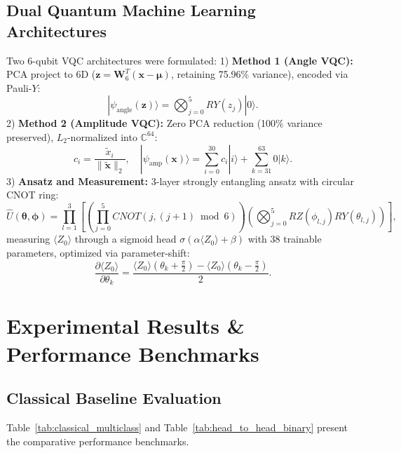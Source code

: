 \documentclass{ieeeaccess}
\begin{document}
\subsection{Dual Quantum Machine Learning Architectures}
Two 6-qubit VQC architectures were formulated:
1) \textbf{Method 1 (Angle VQC):} PCA project to 6D ($\mathbf{z} = \mathbf{W}_6^T(\mathbf{x}-\boldsymbol{\mu})$, retaining 75.96\% variance), encoded via Pauli-$Y$:
\begin{equation}
|\psi_{\text{angle}}(\mathbf{z})\rangle = \bigotimes_{j=0}^5 RY(z_j)|0\rangle.
\end{equation}
2) \textbf{Method 2 (Amplitude VQC):} Zero PCA reduction (100\% variance preserved), $L_2$-normalized into $\mathbb{C}^{64}$:
\begin{equation}
c_i = \frac{\tilde{x}_i}{\|\tilde{\mathbf{x}}\|_2}, \quad |\psi_{\text{amp}}(\mathbf{x})\rangle = \sum_{i=0}^{30} c_i |i\rangle + \sum_{k=31}^{63} 0 |k\rangle.
\end{equation}
3) \textbf{Ansatz and Measurement:} 3-layer strongly entangling ansatz with circular CNOT ring:
\begin{equation}
\hat{U}(\boldsymbol{\theta}, \boldsymbol{\phi}) = \prod_{l=1}^3 \left[ \left(\prod_{j=0}^5 CNOT(j, (j+1)\bmod 6)\right) \left(\bigotimes_{j=0}^5 RZ(\phi_{l,j}) RY(\theta_{l,j})\right) \right],
\end{equation}
measuring $\langle Z_0 \rangle$ through a sigmoid head $\sigma(\alpha \langle Z_0 \rangle + \beta)$ with 38 trainable parameters, optimized via parameter-shift:
\begin{equation}
\frac{\partial \langle Z_0 \rangle}{\partial \theta_k} = \frac{\langle Z_0 \rangle(\theta_k + \frac{\pi}{2}) - \langle Z_0 \rangle(\theta_k - \frac{\pi}{2})}{2}.
\end{equation}

\section{Experimental Results \& Performance Benchmarks}
\label{sec:results}

\subsection{Classical Baseline Evaluation}
Table~\ref{tab:classical_multiclass} and Table~\ref{tab:head_to_head_binary} present the comparative performance benchmarks.
\end{document}
